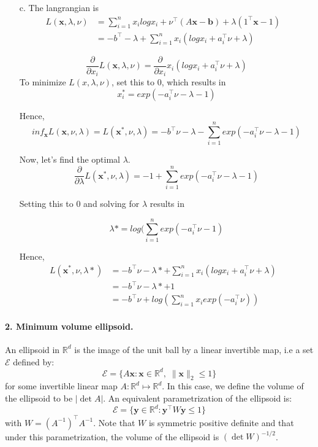 \documentclass[11pt]{article}
\theoremstyle{remark}
\newcommand{\R}{\mathbb{R}}                     %
\newcommand{\bx}{\mathbf{x}}
\newcommand{\by}{\mathbf{y}}
\begin{document}
\begin{itemize}
\item[c.]
The langrangian is
\begin{align*}
L(\bx,\lambda,\nu)&=\sum_{i=1}^n x_ilogx_i + \nu^\intercal (A\bx-\textbf{b}) + \lambda(1^\intercal \bx -1)&\\
&=-b^\intercal -\lambda + \sum_{i=1}^n x_i (logx_i+a_i^\intercal \nu + \lambda) 
\end{align*}

$$\frac{\partial}{\partial x_i} L(\bx,\lambda,\nu)=\frac{\partial}{\partial x_i} x_i (logx_i+a^\intercal_i \nu+\lambda)$$
To minimize $L(x,\lambda,\nu)$, set this to $0$, which results in
$$x_i^*=exp(-a_i^\intercal \nu - \lambda - 1)$$

Hence, $$inf_{\bx} L(\bx,\nu,\lambda)=L(\bx^*,\nu,\lambda)=-b^\intercal \nu -\lambda - \sum_{i=1}^n exp(-a_i^\intercal \nu - \lambda - 1)$$

Now, let's find the optimal $\lambda$.
$$\frac{\partial}{\partial \lambda}  L(\bx^*,\nu,\lambda) = -1 + \sum_{i=1}^n exp(-a_i^\intercal \nu - \lambda - 1)$$

Setting this to $0$ and solving for $\lambda$ results in

$$\lambda* = log( \sum_{i=1}^n exp(-a_i^\intercal \nu - 1)$$

Hence,
\begin{align*}
L(\bx^*,\nu,\lambda*) &=-b^\intercal \nu -\lambda* + \sum_{i=1}^n x_i (logx_i+a_i^\intercal \nu + \lambda) &\\
&= -b^\intercal \nu -\lambda* + 1 &\\
&= -b^\intercal \nu + log(\sum_{i=1}^n x_i  exp(-a_i^\intercal \nu))
\end{align*}

\end{itemize}
\color{black}

\paragraph{2. Minimum volume ellipsoid.}

An ellipsoid in $\R^d$ is the image of the unit ball by a linear invertible map, i.e a set $\mathcal{E}$ defined by:
\begin{displaymath}
    \mathcal{E} = \{A\bx: \bx\in\R^d,\;\|\bx\|_2\leq 1\}
\end{displaymath}
for some invertible linear map $A:\R^d\mapsto\R^d$. In this case, we define the volume of the ellipsoid to be $|\det A|$. An equivalent parametrization of the ellipsoid is:
\begin{displaymath}
    \mathcal{E} = \{\by\in\R^d: \by^\intercal W \by\leq 1\}
\end{displaymath}
with $W = (A^{-1})^\intercal A^{-1}$. Note that $W$ is symmetric positive definite and that under this parametrization, the volume of the ellipsoid is $(\det W)^{-1/2}$.
\end{document}
